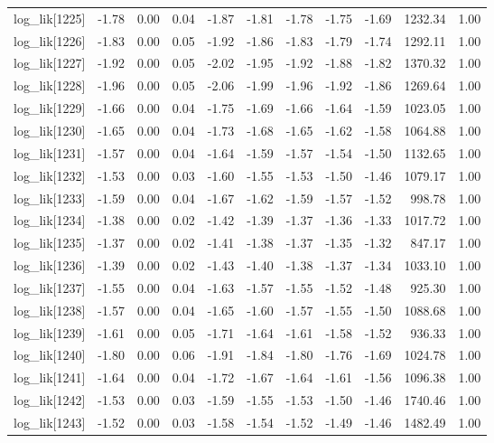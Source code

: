 \begin{table}[ht]
\begin{tabular}{rrrrrrrrrrr}
  log\_lik[1225] & -1.78 & 0.00 & 0.04 & -1.87 & -1.81 & -1.78 & -1.75 & -1.69 & 1232.34 & 1.00 \\ 
  log\_lik[1226] & -1.83 & 0.00 & 0.05 & -1.92 & -1.86 & -1.83 & -1.79 & -1.74 & 1292.11 & 1.00 \\ 
  log\_lik[1227] & -1.92 & 0.00 & 0.05 & -2.02 & -1.95 & -1.92 & -1.88 & -1.82 & 1370.32 & 1.00 \\ 
  log\_lik[1228] & -1.96 & 0.00 & 0.05 & -2.06 & -1.99 & -1.96 & -1.92 & -1.86 & 1269.64 & 1.00 \\ 
  log\_lik[1229] & -1.66 & 0.00 & 0.04 & -1.75 & -1.69 & -1.66 & -1.64 & -1.59 & 1023.05 & 1.00 \\ 
  log\_lik[1230] & -1.65 & 0.00 & 0.04 & -1.73 & -1.68 & -1.65 & -1.62 & -1.58 & 1064.88 & 1.00 \\ 
  log\_lik[1231] & -1.57 & 0.00 & 0.04 & -1.64 & -1.59 & -1.57 & -1.54 & -1.50 & 1132.65 & 1.00 \\ 
  log\_lik[1232] & -1.53 & 0.00 & 0.03 & -1.60 & -1.55 & -1.53 & -1.50 & -1.46 & 1079.17 & 1.00 \\ 
  log\_lik[1233] & -1.59 & 0.00 & 0.04 & -1.67 & -1.62 & -1.59 & -1.57 & -1.52 & 998.78 & 1.00 \\ 
  log\_lik[1234] & -1.38 & 0.00 & 0.02 & -1.42 & -1.39 & -1.37 & -1.36 & -1.33 & 1017.72 & 1.00 \\ 
  log\_lik[1235] & -1.37 & 0.00 & 0.02 & -1.41 & -1.38 & -1.37 & -1.35 & -1.32 & 847.17 & 1.00 \\ 
  log\_lik[1236] & -1.39 & 0.00 & 0.02 & -1.43 & -1.40 & -1.38 & -1.37 & -1.34 & 1033.10 & 1.00 \\ 
  log\_lik[1237] & -1.55 & 0.00 & 0.04 & -1.63 & -1.57 & -1.55 & -1.52 & -1.48 & 925.30 & 1.00 \\ 
  log\_lik[1238] & -1.57 & 0.00 & 0.04 & -1.65 & -1.60 & -1.57 & -1.55 & -1.50 & 1088.68 & 1.00 \\ 
  log\_lik[1239] & -1.61 & 0.00 & 0.05 & -1.71 & -1.64 & -1.61 & -1.58 & -1.52 & 936.33 & 1.00 \\ 
  log\_lik[1240] & -1.80 & 0.00 & 0.06 & -1.91 & -1.84 & -1.80 & -1.76 & -1.69 & 1024.78 & 1.00 \\ 
  log\_lik[1241] & -1.64 & 0.00 & 0.04 & -1.72 & -1.67 & -1.64 & -1.61 & -1.56 & 1096.38 & 1.00 \\ 
  log\_lik[1242] & -1.53 & 0.00 & 0.03 & -1.59 & -1.55 & -1.53 & -1.50 & -1.46 & 1740.46 & 1.00 \\ 
  log\_lik[1243] & -1.52 & 0.00 & 0.03 & -1.58 & -1.54 & -1.52 & -1.49 & -1.46 & 1482.49 & 1.00 \\ 

\end{tabular}
\end{table}

